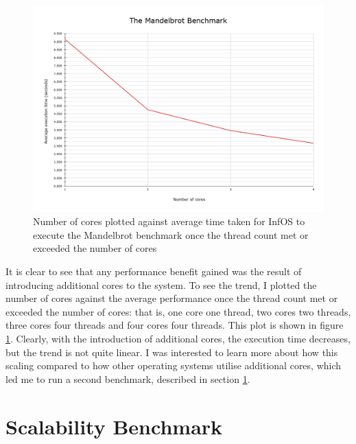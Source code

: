 \documentclass[bsc,frontabs,singlespacing,parskip,deptreport]{infthesis}     %
\begin{document}
\begin{figure}[h]
    \centering
    \includegraphics[scale=0.35]{figures/mandelbrot-graph.png}
    \caption{Number of cores plotted against average time taken for InfOS to execute the Mandelbrot benchmark once the thread count met or exceeded the number of cores}
    \label{mandelbrot-graph}
\end{figure}

It is clear to see that any performance benefit gained was the result of introducing additional cores to the system. To see the trend, I plotted the number of cores against the average performance once the thread count met or exceeded the number of cores: that is, one core one thread, two cores two threads, three cores four threads and four cores four threads. This plot is shown in figure \ref{mandelbrot-graph}. Clearly, with the introduction of additional cores, the execution time decreases, but the trend is not quite linear. I was interested to learn more about how this scaling compared to how other operating systems utilise additional cores, which led me to run a second benchmark, described in section \ref{mb-mod-benchmark}.

\section{Scalability Benchmark}
\label{mb-mod-benchmark}
\end{document}
